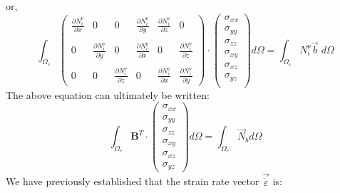 or, 
\begin{equation}
\int_{\Omega_e} 
\left(
\begin{array}{cccccc}
\frac{\partial N_i^\upnu}{\partial x} & 0 & 0& 
\frac{\partial N_i^\upnu}{\partial y} & \frac{\partial N_i^\upnu}{\partial z} & 0\\  \\
0 & \frac{\partial N_i^\upnu}{\partial y} & 0  & \frac{\partial N_i^\upnu}{\partial x}  & 0 &
\frac{\partial N_i^\upnu}{\partial z}  \\ \\
0 & 0 & \frac{\partial N_i^\upnu}{\partial z} &  0 & \frac{\partial N_i^\upnu}{\partial x} &  
\frac{\partial N_i^\upnu}{\partial y} 
\end{array}
\right)
\cdot
\left(
\begin{array}{c}
\sigma_{xx}\\
\sigma_{yy}\\
\sigma_{zz}\\
\sigma_{xy}\\
\sigma_{xz}\\
\sigma_{yz}\\
\end{array}
\right)
d\Omega = \int_{\Omega_e} N_i^\upnu {\vec b} \; d\Omega 
\end{equation}
The above equation can ultimately be written:
\begin{equation}
\int_{\Omega_e} {\bm B}^T \cdot 
\left(
\begin{array}{c}
\sigma_{xx}\\
\sigma_{yy}\\
\sigma_{zz}\\
\sigma_{xy}\\
\sigma_{xz}\\
\sigma_{yz}
\end{array}
\right)
d\Omega
=
\int_{\Omega_e} {\vec N}_b d\Omega 
\end{equation}
We have previously established that the strain rate 
vector $\vec{\dot \varepsilon}$ is:
